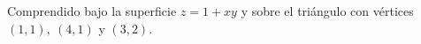 \item Comprendido bajo la superficie $z = 1 + xy$ y sobre el triángulo con vértices $(1, 1), \ (4, 1)$ y $(3, 2)$.
